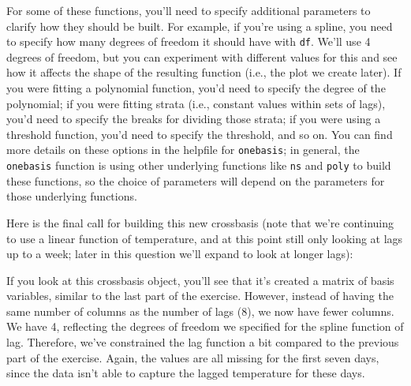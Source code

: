 \documentclass[
]{book}
\newenvironment{Shaded}{\begin{snugshade}}{\end{snugshade}}
\newcommand{\AttributeTok}[1]{\textcolor[rgb]{0.77,0.63,0.00}{#1}}
\newcommand{\DecValTok}[1]{\textcolor[rgb]{0.00,0.00,0.81}{#1}}
\newcommand{\FunctionTok}[1]{\textcolor[rgb]{0.00,0.00,0.00}{#1}}
\newcommand{\NormalTok}[1]{#1}
\newcommand{\OtherTok}[1]{\textcolor[rgb]{0.56,0.35,0.01}{#1}}
\newcommand{\SpecialCharTok}[1]{\textcolor[rgb]{0.00,0.00,0.00}{#1}}
\newcommand{\StringTok}[1]{\textcolor[rgb]{0.31,0.60,0.02}{#1}}
\begin{document}
For some of these functions, you'll need to specify additional parameters to clarify
how they should be built. For example, if you're using a spline, you need to specify
how many degrees of freedom it should have with \texttt{df}. We'll use 4 degrees of freedom,
but you can experiment with different values for this and see how it affects the shape
of the resulting function (i.e., the plot we create later). If you were fitting a
polynomial function,
you'd need to specify the degree of the polynomial; if you were fitting strata (i.e.,
constant values within sets of lags), you'd need to specify the breaks for dividing
those strata; if you were using a threshold function, you'd need to specify the threshold,
and so on. You can find more details on these options in the helpfile for \texttt{onebasis};
in general, the \texttt{onebasis} function is using other underlying functions like \texttt{ns} and
\texttt{poly} to build these functions, so the choice of parameters will depend on the parameters
for those underlying functions.

Here is the final call for building this new crossbasis (note that we're continuing to
use a linear function of temperature, and at this point still only looking at lags up to
a week; later in this question we'll expand to look at longer lags):

\begin{Shaded}
\end{Shaded}

If you look at this crossbasis object, you'll see that it's created a matrix of basis
variables, similar to the last part of the exercise. However, instead of having the same
number of columns as the number of lags (8), we now have fewer columns. We have 4, reflecting
the degrees of freedom we specified for the spline function of lag. Therefore, we've
constrained the lag function a bit compared to the previous part of the exercise. Again,
the values are all missing for the first seven days, since the data isn't able to capture
the lagged temperature for these days.
\end{document}

